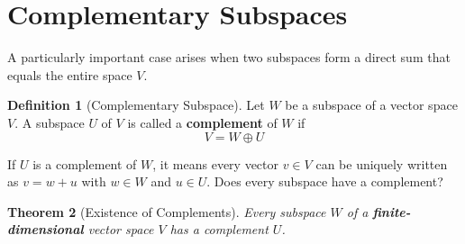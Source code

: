 \documentclass[11pt]{article}
\newtheorem{theorem}{Theorem}[section]
\theoremstyle{definition}
\newtheorem{definition}[theorem]{Definition}
\theoremstyle{remark}
\newcommand{\directsum}{\oplus}
\begin{document}
\section{Complementary Subspaces}

A particularly important case arises when two subspaces form a direct sum that equals the entire space $V$.

\begin{definition}[Complementary Subspace]
Let $W$ be a subspace of a vector space $V$. A subspace $U$ of $V$ is called a \textbf{complement} of $W$ if
\[ V = W \directsum U \]
\end{definition}

If $U$ is a complement of $W$, it means every vector $v \in V$ can be uniquely written as $v=w+u$ with $w \in W$ and $u \in U$. Does every subspace have a complement?

\begin{theorem}[Existence of Complements]
Every subspace $W$ of a \textbf{finite-dimensional} vector space $V$ has a complement $U$.
\end{theorem}
\end{document}
